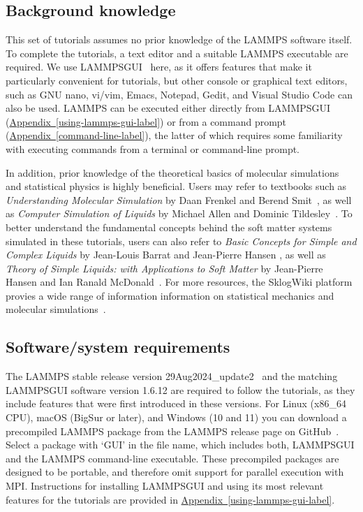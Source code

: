 \documentclass[9pt,tutorial]{livecoms}
\newcommand{\lammpsgui}{\textsf{LAMMPS\textendash GUI}}
\begin{document}
\subsection{Background knowledge}

This set of tutorials assumes no prior knowledge of the LAMMPS software
itself.  To complete the tutorials, a text editor and a suitable LAMMPS
executable are required.  We use \lammpsgui{}~\cite{lammps_gui_docs}
here, as it offers features that make it particularly convenient for
tutorials, but other console or graphical text editors, such as GNU
nano, vi/vim, Emacs, Notepad, Gedit, and Visual Studio Code can also be
used.  LAMMPS can be executed either directly from \lammpsgui{}
(\hyperref[using-lammps-gui-label]{Appendix~\ref{using-lammps-gui-label}})
or from a command prompt
(\hyperref[command-line-label]{Appendix~\ref{command-line-label}}), the
latter of which requires some familiarity with executing commands from a
terminal or command-line prompt.

In addition, prior knowledge of the theoretical basics of molecular
simulations and statistical physics is highly beneficial.  Users may
refer to textbooks such as \textit{Understanding Molecular Simulation} by
Daan Frenkel and Berend Smit~\cite{frenkel2023understanding}, as well as
\textit{Computer Simulation of Liquids} by Michael Allen and Dominic
Tildesley~\cite{allen2017computer}.  To better understand
the fundamental concepts behind the soft matter systems simulated in these
tutorials, users can also refer to \textit{Basic Concepts for Simple and
  Complex Liquids} by Jean-Louis Barrat and Jean-Pierre Hansen
\cite{barrat2003basic}, as well as \textit{Theory of Simple Liquids:
  with Applications to Soft Matter} by Jean-Pierre Hansen and Ian Ranald
McDonald~\cite{hansen2013theory}.  For more resources, the SklogWiki
platform provies a wide range of information information on statistical mechanics
and molecular simulations~\cite{sklogwiki_main_page}.

\subsection{Software/system requirements}

The LAMMPS stable release version 29Aug2024\_update2~\cite{lammps_code}
and the matching \lammpsgui{} software version 1.6.12 are required to
follow the tutorials, as they include features that were first
introduced in these versions.  For Linux (x86\_64 CPU), macOS (BigSur or
later), and Windows (10 and 11) you can download a precompiled LAMMPS
package from the LAMMPS release page on
GitHub~\cite{lammps_github_release}.  Select a package with `GUI' in the
file name, which includes both, \lammpsgui{} and the LAMMPS command-line
executable.  These precompiled packages are designed to be portable, and
therefore omit support for parallel execution with MPI.  Instructions
for installing \lammpsgui{} and using its most relevant features for the
tutorials are provided in
\hyperref[using-lammps-gui-label]{Appendix~\ref{using-lammps-gui-label}}.
\end{document}
